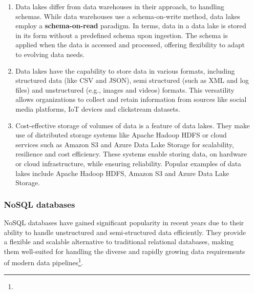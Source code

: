 \begin{enumerate}
    \item Data lakes differ from data warehouses in their approach, to handling schemas. While data warehouses use a schema-on-write method, data lakes employ a \textbf{schema-on-read} paradigm. In terms, data in a data lake is stored in its form without a predefined schema upon ingestion. The schema is applied when the data is accessed and processed, offering flexibility to adapt to evolving data needs\footnotemark[20].
    \item Data lakes have the capability to store data in various formats, including structured data (like CSV and JSON), semi structured (such as XML and log files) and unstructured (e.g., images and videos) formats. This versatility allows organizations to collect and retain information from sources like social media platforms, IoT devices and clickstream datasets\footnotemark[20].
    \item Cost-effective storage of volumes of data is a feature of data lakes. They make use of distributed storage systems like Apache Hadoop HDFS or cloud services such as Amazon S3 and Azure Data Lake Storage for scalability, resilience and cost efficiency. These systems enable storing data, on hardware or cloud infrastructure, while ensuring reliability. Popular examples of data lakes include Apache Hadoop HDFS, Amazon S3 and Azure Data Lake Storage\footnotemark[20].
\end{enumerate}

\subsubsection{NoSQL databases}

NoSQL databases have gained significant popularity in recent years due to their ability to handle unstructured and semi-structured data efficiently. They provide a flexible and scalable alternative to traditional relational databases, making them well-suited for handling the diverse and rapidly growing data requirements of modern data pipelines\footnote[21]{}.

